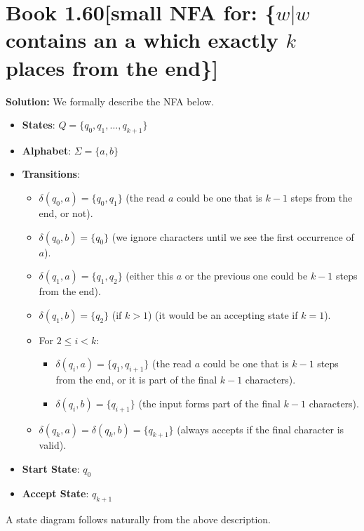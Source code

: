 \documentclass[11pt]{article}
\newenvironment{question}[2]
{\newpage\section{#1\texorpdfstring{\hfill}{horizontal spacing}{\rm\normalsize #2}}}{}
\newenvironment{solution}
{\textbf{Solution: }\color{blue}}
{\color{black}}
\begin{document}
\begin{question}{Book 1.60}{[small NFA for: \{\(w | w\) contains an \textbf{a} which exactly \(k\) places from the end\}]}
\begin{solution}
We formally describe the NFA below.
\begin{itemize}
    \item \textbf{States}: \(Q=\{q_0,q_1,\ldots,q_{k+1}\}\)
    \item \textbf{Alphabet}: \(\Sigma = \{a,b\}\)
    \item \textbf{Transitions}:
    \begin{itemize}
        \item \(\delta(q_0,a) = \{q_0, q_1\}\) (the read \(a\) could be one that is \(k-1\) steps from the end, or not).
        \item \(\delta(q_0,b) = \{q_0\}\) (we ignore characters until we see the first occurrence of \(a\)).
        \item \(\delta(q_1,a) = \{q_1,q_2\}\) (either this \(a\) or the previous one could be \(k-1\) steps from the end).
        \item \(\delta(q_1,b) = \{q_2\}\) (if \(k>1\)) (it would be an accepting state if \(k=1\)).
        \item For \(2 \leq i < k\):
        \begin{itemize}
            \item \(\delta(q_i,a)=\{q_1,q_{i+1}\}\) (the read \(a\) could be one that is \(k-1\) steps from the end, or it is part of the final \(k-1\) characters).
            \item \(\delta(q_i,b)=\{q_{i+1}\}\) (the input forms part of the final \(k-1\) characters).
        \end{itemize}
        \item \(\delta(q_k,a)= \delta(q_k,b) = \{q_{k+1}\}\) (always accepts if the final character is valid).
    \end{itemize}
    \item \textbf{Start State}: \(q_0\)
    \item \textbf{Accept State}: \(q_{k+1}\)
\end{itemize}

A state diagram follows naturally from the above description.

\end{solution}
\end{question}

\end{document}
